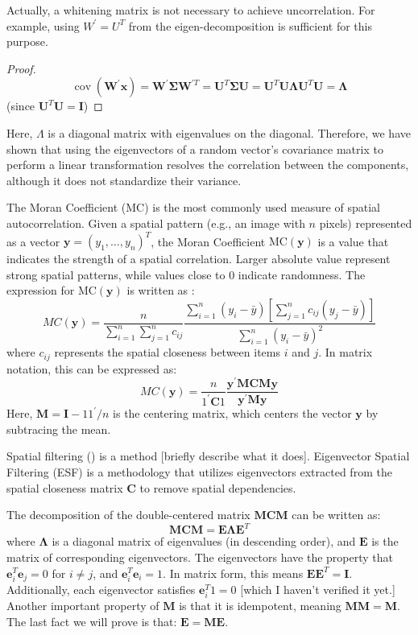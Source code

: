 \documentclass[12pt]{article}
\begin{document}
Actually, a whitening matrix is not necessary to achieve uncorrelation. For example, using \( W^{\prime} = U^T \) from the eigen-decomposition is sufficient for this purpose.

\begin{proof}
  \[
    \operatorname{cov}\left(\mathbf{W}^{\prime} \mathbf{x}\right)=\mathbf{W}^{\prime} \boldsymbol{\Sigma} \mathbf{W}^{\prime T}=\mathbf{U}^T \boldsymbol{\Sigma} \mathbf{U}=\mathbf{U}^T \mathbf{U} \boldsymbol{\Lambda} \mathbf{U}^T \mathbf{U}=\boldsymbol{\Lambda}
  \]
  (since \( \mathbf{U}^T \mathbf{U}=\mathbf{I} \))
\end{proof}

Here, \( \Lambda \) is a diagonal matrix with eigenvalues on the diagonal. Therefore, we have shown that using the eigenvectors of a random vector's covariance matrix to perform a linear transformation resolves the correlation between the components, although it does not standardize their variance.

The Moran Coefficient (MC) is the most commonly used measure of spatial autocorrelation. Given a spatial pattern (e.g., an image with \( n \) pixels) represented as a vector \( \mathbf{y}=\left(y_1, \ldots, y_n\right)^T \), the Moran Coefficient \( \text{MC} (\mathbf{y}) \) is a value that indicates the strength of a spatial correlation. Larger absolute value represent strong spatial patterns, while values close to 0 indicate randomness. The expression for \( \text{MC} (\mathbf{y}) \) is written as \cite{Griffith_Chun_2014}:
\[
  M C(\mathbf{y})=\frac{n}{\sum_{i=1}^n \sum_{j=1}^n c_{i j}} \frac{\sum_{i=1}^n\left(y_i-\bar{y}\right)\left[\sum_{j=1}^n c_{i j}\left(y_j-\bar{y}\right)\right]}{\sum_{i=1}^n\left(y_i-\bar{y}\right)^2}
\]
where \( c_{ij} \) represents the spatial closeness between items \( i \) and \( j \). In matrix notation, this can be expressed as:
\[
  M C(\mathbf{y})=\frac{n}{1^{\prime} \mathbf{C} 1} \frac{\mathbf{y}^{\prime} \mathbf{M C M y}}{\mathbf{y}^{\prime} \mathbf{My}}
\]
Here, \( \mathbf{M}=\mathbf{I}-11^{\prime} / n \) is the centering matrix, which centers the vector \( \mathbf{y} \) by subtracing the mean.

Spatial filtering (\cite{Tiefelsdorf_Griffith_2007}) is a method [briefly describe what it does]. Eigenvector Spatial Filtering (ESF) is a methodology that utilizes eigenvectors extracted from the spatial closeness matrix \( \mathbf{C} \) to remove spatial dependencies. 

The decomposition of the double-centered matrix \( \mathbf{M C M} \) can be written as:
\[
  \mathbf{M C M}=\mathbf{E} \boldsymbol{\Lambda} \mathbf{E}^{T}
\]
where \( \boldsymbol{\Lambda} \) is a diagonal matrix of eigenvalues (in descending order), and \( \mathbf{E} \) is the matrix of corresponding eigenvectors. The eigenvectors have the property that \( \mathbf{e}_i^T \mathbf{e}_j=0 \) for \( i \neq j \), and \( \mathbf{e}_i^T \mathbf{e}_i=1 \). In matrix form, this means \( \mathbf{E E}^T=\mathbf{I} \). Additionally, each eigenvector satisfies \( \mathbf{e}_i^T 1 = 0 \) [which I haven't verified it yet.] Another important property of \(\mathbf{M}\) is that it is idempotent, meaning \(\mathbf{M M}=\mathbf{M}\). The last fact we will prove is that: \( \mathbf{E}=\mathbf{M E} \).
\end{document}

